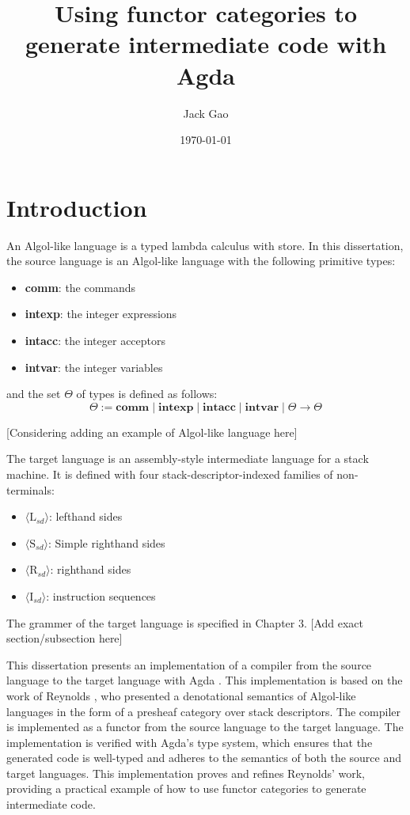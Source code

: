 \documentclass[12pt,twoside,a4paper]{report}
\theoremstyle{definition}
\theoremstyle{definition}
\begin{document}
\dominitoc

\title{Using functor categories to generate intermediate code with Agda}
\author{Jack Gao}
\date{\today}
\maketitle

\tableofcontents
\newpage

\chapter{Introduction}
    \minitoc
    An Algol-like language is a typed lambda calculus with store. In this dissertation, the source language is an Algol-like language with the following primitive types:
    \begin{itemize}
        \item 
            \textbf{comm}: the commands
        \item 
            \textbf{intexp}: the integer expressions
        \item 
            \textbf{intacc}: the integer acceptors
        \item 
            \textbf{intvar}: the integer variables
    \end{itemize}
    and the set $\Theta$ of types is defined as follows:
    \[ \Theta := \textbf{comm} \mid \textbf{intexp} \mid \textbf{intacc} \mid \textbf{intvar} \mid \Theta \to \Theta \]

    [Considering adding an example of Algol-like language here]

    The target language is an assembly-style intermediate language for a stack machine. It is defined with four stack-descriptor-indexed families of non-terminals: 
    \begin{itemize}
        \item 
            $\langle\text{L}_{sd}\rangle$: lefthand sides
        \item 
            $\langle\text{S}_{sd}\rangle$: Simple righthand sides
        \item
            $\langle\text{R}_{sd}\rangle$: righthand sides
        \item
            $\langle\text{I}_{sd}\rangle$: instruction sequences
    \end{itemize}

    The grammer of the target language is specified in Chapter 3. [Add exact section/subsection here]

    This dissertation presents an implementation of a compiler from the source language to the target language with Agda \cite{Agda}. This implementation is based on the work of Reynolds \cite{Reynolds}, who presented a denotational semantics of Algol-like languages in the form of a presheaf category over stack descriptors. The compiler is implemented as a functor from the source language to the target language. The implementation is verified with Agda's type system, which ensures that the generated code is well-typed and adheres to the semantics of both the source and target languages. This implementation proves and refines Reynolds' work, providing a practical example of how to use functor categories to generate intermediate code.
\end{document}
